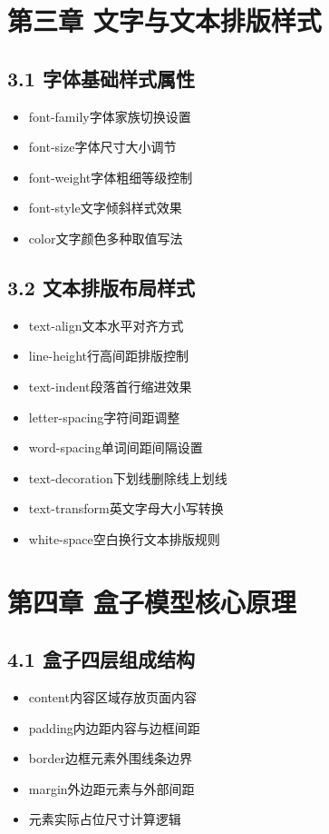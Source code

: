 \section{第三章 文字与文本排版样式}
\subsection{3.1 字体基础样式属性}
\begin{itemize}[leftmargin=*]
\item font-family字体家族切换设置
\item font-size字体尺寸大小调节
\item font-weight字体粗细等级控制
\item font-style文字倾斜样式效果
\item color文字颜色多种取值写法
\end{itemize}

\subsection{3.2 文本排版布局样式}
\begin{itemize}[leftmargin=*]
\item text-align文本水平对齐方式
\item line-height行高间距排版控制
\item text-indent段落首行缩进效果
\item letter-spacing字符间距调整
\item word-spacing单词间距间隔设置
\item text-decoration下划线删除线上划线
\item text-transform英文字母大小写转换
\item white-space空白换行文本排版规则
\end{itemize}

\section{第四章 盒子模型核心原理}
\subsection{4.1 盒子四层组成结构}
\begin{itemize}[leftmargin=*]
\item content内容区域存放页面内容
\item padding内边距内容与边框间距
\item border边框元素外围线条边界
\item margin外边距元素与外部间距
\item 元素实际占位尺寸计算逻辑
\end{itemize}

